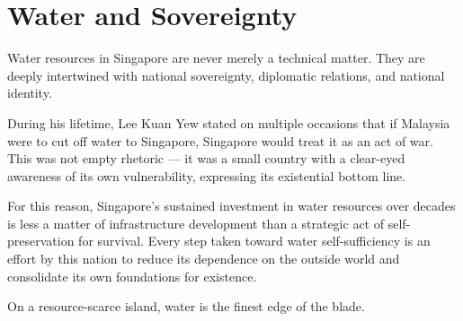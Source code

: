 \section{Water and Sovereignty}

Water resources in Singapore are never merely a technical matter. They are deeply intertwined with national sovereignty, diplomatic relations, and national identity.

During his lifetime, Lee Kuan Yew stated on multiple occasions that if Malaysia were to cut off water to Singapore, Singapore would treat it as an act of war. This was not empty rhetoric --- it was a small country with a clear-eyed awareness of its own vulnerability, expressing its existential bottom line.

For this reason, Singapore's sustained investment in water resources over decades is less a matter of infrastructure development than a strategic act of self-preservation for survival. Every step taken toward water self-sufficiency is an effort by this nation to reduce its dependence on the outside world and consolidate its own foundations for existence.

On a resource-scarce island, water is the finest edge of the blade.
